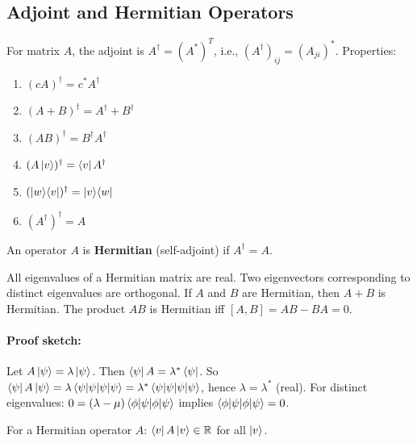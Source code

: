 \documentclass[10pt,a4paper]{article}
\begin{document}
\subsection{Adjoint and Hermitian Operators}

\begin{tcolorbox}[defstyle, title={Definition: Adjoint (Hermitian Conjugate)}]
For matrix $A$, the adjoint is $A^\dagger=(A^*)^T$, i.e., $(A^\dagger)_{ij}=(A_{ji})^*$. Properties:
\begin{enumerate}[nosep]
\item $(cA)^\dagger=c^*A^\dagger$
\item $(A+B)^\dagger=A^\dagger+B^\dagger$
\item $(AB)^\dagger=B^\dagger A^\dagger$
\item $(A\ket{v})^\dagger=\bra{v}A^\dagger$
\item $(\ket{w}\!\bra{v})^\dagger=\ket{v}\!\bra{w}$
\item $(A^\dagger)^\dagger=A$
\end{enumerate}
\end{tcolorbox}

\begin{tcolorbox}[defstyle, title={Definition: Hermitian Operator}]
An operator $A$ is \textbf{Hermitian} (self-adjoint) if $A^\dagger=A$.
\end{tcolorbox}

\begin{tcolorbox}[propstyle, title={Theorem: Properties of Hermitian Operators}]
All eigenvalues of a Hermitian matrix are real. Two eigenvectors corresponding to distinct eigenvalues are orthogonal. If $A$ and $B$ are Hermitian, then $A+B$ is Hermitian. The product $AB$ is Hermitian iff $[A,B]=AB-BA=0$.
\end{tcolorbox}

\paragraph{Proof sketch:} Let $A\ket{\psi}=\lambda\ket{\psi}$. Then $\bra{\psi}A=\lambda^*\bra{\psi}$. So $\bra{\psi}A\ket{\psi}=\lambda\braket{\psi|\psi}=\lambda^*\braket{\psi|\psi}$, hence $\lambda=\lambda^*$ (real). For distinct eigenvalues: $0=(\lambda-\mu)\braket{\phi|\psi}$ implies $\braket{\phi|\psi}=0$.

\begin{tcolorbox}[propstyle, title={Property: Hermitian Expectation Values}]
For a Hermitian operator $A$: $\bra{v}A\ket{v}\in\mathbb{R}$ for all $\ket{v}$.
\end{tcolorbox}
\end{document}
